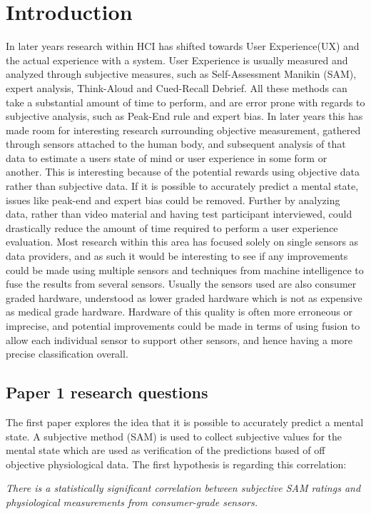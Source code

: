 \chapter{Introduction}
In later years research within HCI has shifted towards User Experience(UX) and the actual experience with a system.
User Experience is usually measured and analyzed through subjective measures, such as Self-Assessment Manikin (SAM), expert analysis, Think-Aloud and Cued-Recall Debrief.
All these methods can take a substantial amount of time to perform, and are error prone with regards to subjective analysis, such as Peak-End rule and expert bias.
In later years this has made room for interesting research surrounding objective measurement, gathered through sensors attached to the human body, and subsequent analysis of that data to estimate a users state of mind or user experience in some form or another.
This is interesting because of the potential rewards using objective data rather than subjective data.
If it is possible to accurately predict a mental state, issues like peak-end and expert bias could be removed.
Further by analyzing data, rather than video material and having test participant interviewed, could drastically reduce the amount of time required to perform a user experience evaluation.
Most research within this area has focused solely on single sensors as data providers, and as such it would be interesting to see if any improvements could be made using multiple sensors and techniques from machine intelligence to fuse the results from several sensors.
Usually the sensors used are also consumer graded hardware, understood as lower graded hardware which is not as expensive as medical grade hardware.
Hardware of this quality is often more erroneous or imprecise, and potential improvements could be made in terms of using fusion to allow each individual sensor to support other sensors, and hence having a more precise classification overall.

\section{Paper 1 research questions}
The first paper explores the idea that it is possible to accurately predict a mental state. A subjective method (SAM) is used to collect subjective values for the mental state which are used as verification of the predictions based of off objective physiological data. The first hypothesis is regarding this correlation:

\textit{There is a statistically significant correlation between subjective SAM ratings and physiological measurements from consumer-grade sensors.}\\\\

